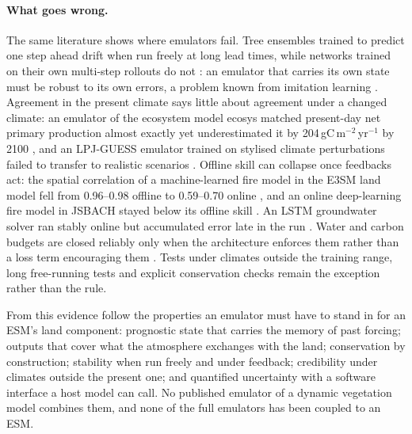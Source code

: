 \documentclass[11pt,a4paper]{article}
\begin{document}
\paragraph{What goes wrong.} The same literature shows where emulators fail. Tree ensembles trained to predict one
step ahead drift when run freely at long lead times, while networks trained on their own multi-step rollouts do not
\citep{R00067,R00593}: an emulator that carries its own state must be robust to its own errors, a problem known from
imitation learning \citep{Ross2011}. Agreement in the present climate says little about agreement under a changed
climate: an emulator of the ecosystem model ecosys matched present-day net primary production almost exactly yet
underestimated it by 204\,gC\,m$^{-2}$\,yr$^{-1}$ by 2100 \citep{R00289}, and an LPJ-GUESS emulator trained on stylised
climate perturbations failed to transfer to realistic scenarios \citep{R00430}. Offline skill can collapse once
feedbacks act: the spatial correlation of a machine-learned fire model in the E3SM land model fell from 0.96--0.98
offline to 0.59--0.70 online \citep{R00911,R00342}, and an online deep-learning fire model in JSBACH stayed below its
offline skill \citep{R00278}. An LSTM groundwater solver ran stably online but accumulated error late in the run
\citep{R02497}. Water and carbon budgets are closed reliably only when the architecture enforces them rather than a
loss term encouraging them \citep{R00532,R00755}. Tests under climates outside the training range, long free-running
tests and explicit conservation checks remain the exception rather than the rule.

From this evidence follow the properties an emulator must have to stand in for an ESM's land component: prognostic
state that carries the memory of past forcing; outputs that cover what the atmosphere exchanges with the land;
conservation by construction; stability when run freely and under feedback; credibility under climates outside the
present one; and quantified uncertainty with a software interface a host model can call. No published emulator of a
dynamic vegetation model combines them, and none of the full emulators has been coupled to an ESM.
\end{document}

